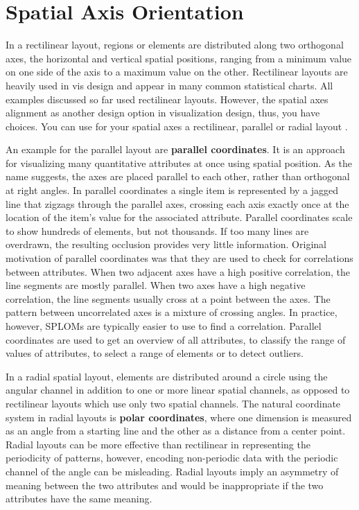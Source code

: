 \documentclass[
]{book}
\begin{document}
\hypertarget{spatial-axis-orientation}{%
\section{Spatial Axis Orientation}\label{spatial-axis-orientation}}

In a rectilinear layout, regions or elements are distributed along two orthogonal axes, the horizontal and vertical spatial positions, ranging from a minimum value on one side of the axis to a maximum value on the other. Rectilinear layouts are heavily used in vis design and appear in many common statistical charts. All examples discussed so far used rectilinear layouts. However, the spatial axes alignment as another design option in visualization design, thus, you have choices. You can use for your spatial axes a rectilinear, parallel or radial layout \citep{munzner2014visualization}.

An example for the parallel layout are \textbf{parallel coordinates}. It is an approach for visualizing many quantitative attributes at once using spatial position. As the name suggests, the axes are placed parallel to each other, rather than orthogonal at right angles.
In parallel coordinates a single item is represented by a jagged line that zigzags through the parallel axes, crossing each axis exactly once at the location of the item's value for the associated attribute. Parallel coordinates scale to show hundreds of elements, but not thousands. If too many lines are overdrawn, the resulting occlusion provides very little information. Original motivation of parallel coordinates was that they are used to check for correlations between attributes. When two adjacent axes have a high positive correlation, the line segments are mostly parallel. When two axes have a high negative correlation, the line segments usually cross at a point between the axes. The pattern between uncorrelated axes is a mixture of crossing angles. In practice, however, SPLOMs are typically easier to use to find a correlation. Parallel coordinates are used to get an overview of all attributes, to classify the range of values of attributes, to select a range of elements or to detect outliers.

In a radial spatial layout, elements are distributed around a circle using the angular channel in addition to one or more linear spatial channels, as opposed to rectilinear layouts which use only two spatial channels. The natural coordinate system in radial layouts is \textbf{polar coordinates}, where one dimension is measured as an angle from a starting line and the other as a distance from a center point. Radial layouts can be more effective than rectilinear in representing the periodicity of patterns, however, encoding non-periodic data with the periodic channel of the angle can be misleading. Radial layouts imply an asymmetry of meaning between the two attributes and would be inappropriate if the two attributes have the same meaning.
\end{document}
